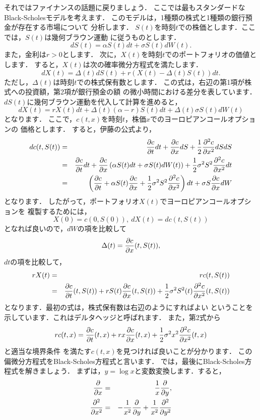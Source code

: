 それではファイナンスの話題に戻りましょう．
ここでは最もスタンダードなBlack-Scholesモデルを考えます．
このモデルは，1種類の株式と1種類の銀行預金が存在する市場について
分析します．
$S(t)$を時刻$t$での株価とします．ここでは，$S(t)$は幾何ブラウン運動
に従うものとします．
\[
 dS(t)=\alpha S(t)dt+\sigma S(t)dW(t).
\]
また，金利は$r>0$とします．
次に，$X(t)$を時刻$t$でのポートフォリオの価値とします．
すると，$X(t)$は次の確率微分方程式を満たします．
\[
 dX(t)=\Delta(t)dS(t)+r(X(t)-\Delta(t)S(t))dt.
\]
ただし，$\Delta(t)$は時刻$t$での株式保有数とします．
この式は，右辺の第1項が株式への投資額，第2項が銀行預金の額
の微小時間における差分を表しています．
$dS(t)$に幾何ブラウン運動を代入して計算を進めると，
\[
 dX(t)=rX(t)dt+\Delta(t)(\alpha-r)S(t)dt+\Delta(t)\sigma S(t)dW(t)
\]
となります．
ここで，$c(t,x)$を時刻$t$，株価$x$でのヨーロピアンコールオプションの
価格とします．
すると，伊藤の公式より，
\begin{eqnarray*}
 dc(t,S(t))& = &\frac{\partial c}{\partial t}dt+\frac{\partial c}{\partial x}dS+
  \frac{1}{2}\frac{\partial^2c}{\partial x^2}dSdS\\
 & = &\frac{\partial c}{\partial t}dt+
  \frac{\partial c}{\partial x}\left(\alpha S(t)dt+\sigma S(t)dW(t)\right)+
  \frac{1}{2}\sigma^2S^2\frac{\partial^2c}{\partial x^2}dt\\
 & = &\left(\frac{\partial c}{\partial t}+\alpha S(t)\frac{\partial c}{\partial x}+
  \frac{1}{2}\sigma^2S^2\frac{\partial^2c}{\partial x^2}\right)dt+
  \sigma S\frac{\partial c}{\partial x}dW
\end{eqnarray*}
となります．
したがって，ポートフォリオ$X(t)$でヨーロピアンコールオプションを
複製するためには，
\[
 X(0)=c(0,S(0)),\ dX(t)=dc(t,S(t))
\]
となれば良いので，$dW$の項を比較して
\[
 \Delta(t)=\frac{\partial c}{\partial x}(t,S(t)),
\]
$dt$の項を比較して，
\begin{eqnarray*}
 rX(t)& = &rc(t,S(t)) \\
 & = &\frac{\partial c}{\partial t}(t,S(t))+rS(t)\frac{\partial c}{\partial x}(t,S(t))+
  \frac{1}{2}\sigma^2S^2(t)\frac{\partial^2c}{\partial x^2}(t,S(t))
\end{eqnarray*}
となります．最初の式は，株式保有数は右辺のようにすればよい
ということを示しています．これはデルタヘッジと呼ばれます．
また，第2式から
\[
 rc(t,x)=\frac{\partial c}{\partial t}(t,x)+rx\frac{\partial c}{\partial x}(t,x)+
  \frac{1}{2}\sigma^2x^2\frac{\partial^2c}{\partial x^2}(t,x)
\]
と適当な境界条件
を満たす$c(t,x)$を見つければ良いことが分かります．
この偏微分方程式をBlack-Scholes方程式と言います．
では，最後にBlack-Scholes方程式を解きましょう．
まずは，$y=\log x$と変数変換します．すると，
\begin{eqnarray*}
 \frac{\partial}{\partial x}& = &\frac{1}{x}\frac{\partial}{\partial y},\\
 \frac{\partial^2}{\partial x^2}& = &-\frac{1}{x^2}\frac{\partial}{\partial y}+\frac{1}{x^2}
  \frac{\partial^2}{\partial y^2}
\end{eqnarray*}
